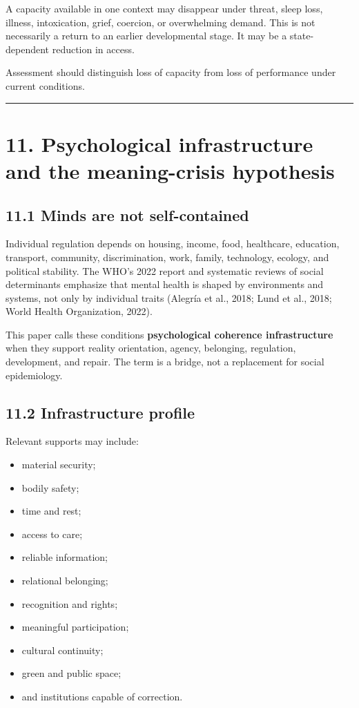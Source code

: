 \documentclass[
  11pt,
]{article}
\providecommand{\tightlist}{%
  \setlength{\itemsep}{0pt}\setlength{\parskip}{0pt}}
\begin{document}
A capacity available in one context may disappear under threat, sleep
loss, illness, intoxication, grief, coercion, or overwhelming demand.
This is not necessarily a return to an earlier developmental stage. It
may be a state-dependent reduction in access.

Assessment should distinguish loss of capacity from loss of performance
under current conditions.

\begin{center}\rule{0.5\linewidth}{0.5pt}\end{center}

\section{11. Psychological infrastructure and the meaning-crisis
hypothesis}\label{psychological-infrastructure-and-the-meaning-crisis-hypothesis}

\subsection{11.1 Minds are not
self-contained}\label{minds-are-not-self-contained}

Individual regulation depends on housing, income, food, healthcare,
education, transport, community, discrimination, work, family,
technology, ecology, and political stability. The WHO's 2022 report and
systematic reviews of social determinants emphasize that mental health
is shaped by environments and systems, not only by individual traits
(Alegría et al., 2018; Lund et al., 2018; World Health Organization,
2022).

This paper calls these conditions \textbf{psychological coherence
infrastructure} when they support reality orientation, agency,
belonging, regulation, development, and repair. The term is a bridge,
not a replacement for social epidemiology.

\subsection{11.2 Infrastructure profile}\label{infrastructure-profile}

Relevant supports may include:

\begin{itemize}
\tightlist
\item
  material security;
\item
  bodily safety;
\item
  time and rest;
\item
  access to care;
\item
  reliable information;
\item
  relational belonging;
\item
  recognition and rights;
\item
  meaningful participation;
\item
  cultural continuity;
\item
  green and public space;
\item
  and institutions capable of correction.
\end{itemize}
\end{document}
